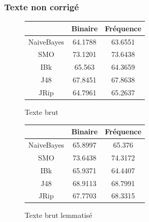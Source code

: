 \documentclass[a4paper, 11pt]{article}
\begin{document}
\subsubsection{Texte non corrigé}
\begin{figure}[h]
\begin{minipage}{0.5\textwidth}
\begin{tabular}{|c|c|c|}
\hline
 & Binaire & Fréquence \\
 \hline
 NaiveBayes & 64.1788 & 63.6551 \\
 \hline
 SMO & 73.1201 & 73.6438 \\
 \hline
 IBk & 65.563 & 64.3659 \\
 \hline
 J48 & 67.8451 & 67.8638 \\
 \hline
 JRip & 64.7961 & 65.2637 \\
 \hline
\end{tabular}
\caption{Texte brut}
\end{minipage}
\begin{minipage}{0.5\textwidth}
\begin{tabular}{|c|c|c|}
\hline
 & Binaire & Fréquence \\
 \hline
 NaiveBayes & 65.8997 & 65.376 \\
 \hline
 SMO & 73.6438 & 74.3172 \\
 \hline
 IBk & 65.9371 & 64.4407 \\
 \hline
 J48 & 68.9113 & 68.7991 \\
 \hline
 JRip & 67.7703 & 68.3315 \\
 \hline
\end{tabular}
\caption{Texte brut lemmatisé}
\end{minipage}
\end{figure}
\vspace{1cm}
\end{document}
